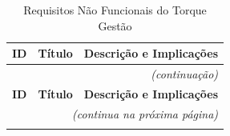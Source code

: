 \documentclass[12pt, a4paper]{article}
\begin{document}
\begin{longtable}{|p{1.2cm}|p{3.5cm}|p{9.5cm}|}
\caption{Requisitos Não Funcionais do Torque Gestão}
\label{tab:rnf} \\

\hline
\textbf{ID} & \textbf{Título} & \textbf{Descrição e Implicações} \\
\hline
\endfirsthead

\multicolumn{3}{r}{\footnotesize\textit{(continuação)}} \\
\hline
\textbf{ID} & \textbf{Título} & \textbf{Descrição e Implicações} \\
\hline
\endhead

\hline
\multicolumn{3}{r}{\footnotesize\textit{(continua na próxima página)}} \\
\endfoot

\hline
\endlastfoot


\end{longtable}
\end{document}
